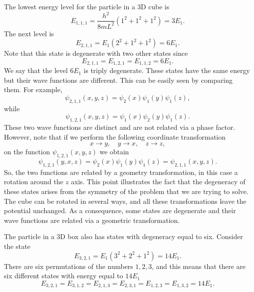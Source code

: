 \documentclass[../Main/chem331-notes.tex]{subfiles}
\begin{document}
The lowest energy level for the particle in a 3D cube is
\begin{equation}
E_{1,1,1} = \frac{h^2}{8mL^2} (1^2 + 1^2 + 1^2) = 3 E_1.
\end{equation}
The next level is
\begin{equation}
E_{2,1,1} =  E_1 (2^2 + 1^2 + 1^2) = 6 E_1.
\end{equation}
Note that this state is degenerate with two other states since
\begin{equation}
E_{2,1,1} = E_{1,2,1} = E_{1,1,2} = 6 E_1.
\end{equation}
We say that the level $6 E_1$ is triply degenerate.
These states have the same energy but their wave functions are different.
This can be easily seen by comparing them. For example, 
\begin{equation}
\psi_{2,1,1}(x,y,z) =  \psi_{2}(x) \psi_{1}(y) \psi_{1}(z),
\end{equation}
while
\begin{equation}
\psi_{1,2,1}(x,y,z) =  \psi_{1}(x) \psi_{2}(y) \psi_{1}(z).
\end{equation}
These two wave functions are distinct and are not related via a phase factor.
However, note that if we perform the following coordinate transformation
\begin{equation}
x \rightarrow y, \quad
y \rightarrow x, \quad
z \rightarrow z,
\end{equation}
on the function $\psi_{1,2,1}(x,y,z)$ we obtain
\begin{equation}
\psi_{1,2,1}(y,x,z) = \psi_{2}(x) \psi_{1}(y) \psi_{1}(z) = \psi_{2,1,1}(x,y,z).
\end{equation}
So, the two functions are related by a geometry transformation, in this case a rotation around the $z$ axis.
This point illustrates the fact that the degeneracy of these states arises from the symmetry of the problem that we are trying to solve.
The cube can be rotated in several ways, and all these transformations leave the potential unchanged.
As a consequence, some states are degenerate and their wave functions are related via a geometric transformation.

The particle in a 3D box also has states with degeneracy equal to six.
Consider the state
\begin{equation}
E_{3,2,1} =  E_1 (3^2 + 2^2 + 1^2) = 14 E_1.
\end{equation}
There are six permutations of the numbers $1, 2, 3$, and this means that there are  six different states with energy equal to $14 E_1$
\begin{equation}
E_{3,2,1} = E_{3,1,2} = E_{2,1,3} = E_{2,3,1} = E_{1,2,3} = E_{1,3,2} = 14 E_1.
\end{equation}
\end{document}
